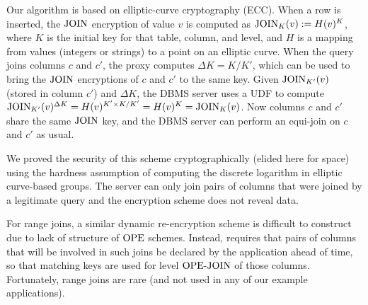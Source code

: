 Our algorithm is based on elliptic-curve cryptography (ECC).  When a
row is inserted, the $\textrm{JOIN}$ encryption of value $v$ is computed as
$\textrm{JOIN}_K(v) := H(v)^K$, where $K$ is the initial key for that table,
column, and level, and $H$ is a mapping from values (integers or
strings) to a point on an elliptic curve.  When the query joins columns $c$ and
$c'$, the proxy computes $\Delta K=K/K'$, which can be used to bring
the $\textrm{JOIN}$ encryptions of $c$ and $c'$ to the same key.  Given
$\textrm{JOIN}_{K'}(v)$ (stored in column $c'$) and $\Delta K$, the DBMS
server uses a UDF to compute $\textrm{JOIN}_{K'}(v)^{\Delta K} =
H(v)^{K'\times K / K'} = H(v)^K = \textrm{JOIN}_K(v)$.  Now columns $c$ and
$c'$ share the same $\textrm{JOIN}$ key, and the DBMS server can perform an
equi-join on $c$ and $c'$ as usual.

We proved the security of this scheme cryptographically (elided here
for space) using the hardness
assumption of computing the discrete logarithm in elliptic curve-based
groups. The server can only join pairs of columns that were joined by
a legitimate query and the encryption scheme does not reveal data.


For range joins, a similar dynamic re-encryption scheme is difficult
to construct due to lack of structure of $\textrm{OPE}$ schemes.  Instead,
\name{} requires that pairs of columns that will be involved in such
joins be declared by the application ahead of time, so that matching
keys are used for level $\textrm{OPE-JOIN}$ of those columns.  Fortunately,
range joins are rare (and not used in any of our example
applications).

